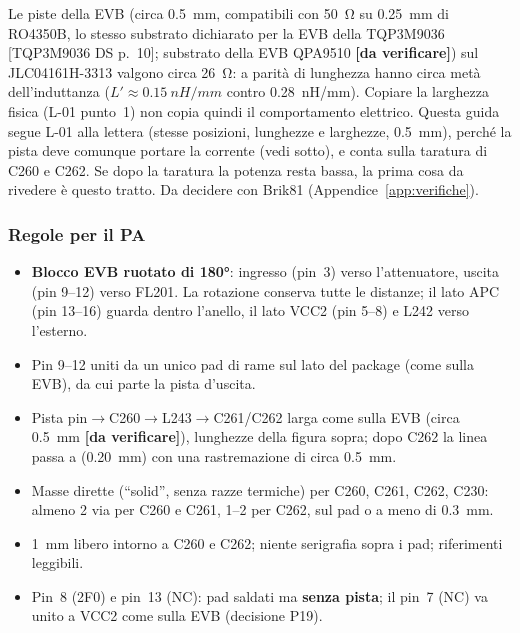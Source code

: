\documentclass[a4paper,10pt]{article}
\newcommand{\net}[1]{\texttt{\detokenize{#1}}}
\newcommand{\dv}{\textcolor{verfr}{\textbf{[da verificare]}}}
\newcommand{\fonte}[1]{{\footnotesize\color{sbgray}[#1]}}
\newcounter{regola}
\begin{document}
\begin{attenzione}
Le piste della EVB (circa \SI{0.5}{mm}, compatibili con \SI{50}{\ohm} su \SI{0.25}{mm} di RO4350B, lo stesso
substrato dichiarato per la EVB della TQP3M9036 \fonte{TQP3M9036 DS p.~10}; substrato della EVB QPA9510
\dv) sul JLC04161H-3313 valgono circa \SI{26}{\ohm}: a parità di lunghezza hanno circa metà
dell'induttanza ($L'\approx\SI{0.15}{nH/mm}$ contro \SI{0.28}{nH/mm}). Copiare la larghezza fisica
(L-01 punto~1) non copia quindi il comportamento elettrico. Questa guida segue L-01 alla lettera
(stesse posizioni, lunghezze e larghezze, \SI{0.5}{mm}), perché la pista deve comunque portare la corrente
(vedi sotto), e conta sulla taratura di C260 e C262. Se dopo la taratura la potenza resta bassa, la
prima cosa da rivedere è questo tratto. Da decidere con Brik81 (Appendice~\ref{app:verifiche}).
\end{attenzione}

\subsubsection{Regole per il PA}
\begin{regola}
\begin{itemize}
\item \textbf{Blocco EVB ruotato di \ang{180}}: ingresso (pin~3) verso l'attenuatore, uscita (pin 9--12)
      verso FL201. La rotazione conserva tutte le distanze; il lato APC (pin 13--16) guarda dentro l'anello,
      il lato VCC2 (pin 5--8) e L242 verso l'esterno.
\item Pin 9--12 uniti da un unico pad di rame sul lato del package (come sulla EVB), da cui parte la pista
      d'uscita.
\item Pista pin$\rightarrow$C260$\rightarrow$L243$\rightarrow$C261/C262 larga come sulla EVB (circa
      \SI{0.5}{mm} \dv), lunghezze della figura sopra; dopo C262 la linea passa a \net{RF_50R}
      (\SI{0.20}{mm}) con una rastremazione di circa \SI{0.5}{mm}.
\item Masse dirette (\enquote{solid}, senza razze termiche) per C260, C261, C262, C230: almeno 2 via per
      C260 e C261, 1--2 per C262, sul pad o a meno di \SI{0.3}{mm}.
\item \SI{1}{mm} libero intorno a C260 e C262; niente serigrafia sopra i pad; riferimenti leggibili.
\item Pin~8 (2F0) e pin~13 (NC): pad saldati ma \textbf{senza pista}; il pin~7 (NC) va unito a VCC2 come
      sulla EVB (decisione P19).
\end{itemize}
\end{regola}
\end{document}
